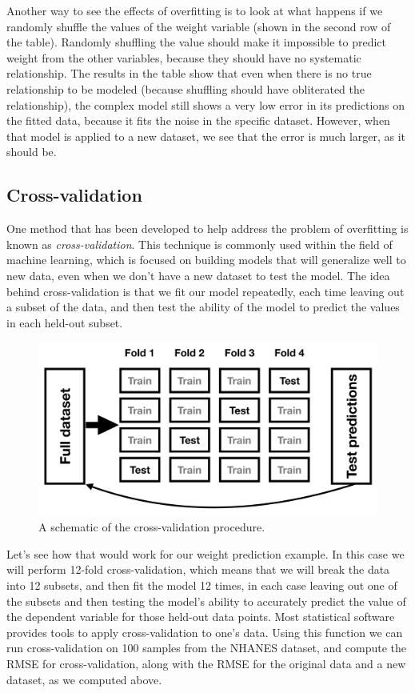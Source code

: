 \documentclass[
  12pt,
]{book}
\begin{document}
Another way to see the effects of overfitting is to look at what happens if we randomly shuffle the values of the weight variable (shown in the second row of the table). Randomly shuffling the value should make it impossible to predict weight from the other variables, because they should have no systematic relationship. The results in the table show that even when there is no true relationship to be modeled (because shuffling should have obliterated the relationship), the complex model still shows a very low error in its predictions on the fitted data, because it fits the noise in the specific dataset. However, when that model is applied to a new dataset, we see that the error is much larger, as it should be.

\hypertarget{cross-validation}{%
\subsection{Cross-validation}\label{cross-validation}}

One method that has been developed to help address the problem of overfitting is known as \emph{cross-validation}. This technique is commonly used within the field of machine learning, which is focused on building models that will generalize well to new data, even when we don't have a new dataset to test the model. The idea behind cross-validation is that we fit our model repeatedly, each time leaving out a subset of the data, and then test the ability of the model to predict the values in each held-out subset.

\begin{figure}
\includegraphics[width=45.74in,height=0.3\textheight]{images/crossvalidation} \caption{A schematic of the  cross-validation procedure.}\label{fig:crossvalidation}
\end{figure}

Let's see how that would work for our weight prediction example. In this case we will perform 12-fold cross-validation, which means that we will break the data into 12 subsets, and then fit the model 12 times, in each case leaving out one of the subsets and then testing the model's ability to accurately predict the value of the dependent variable for those held-out data points. Most statistical software provides tools to apply cross-validation to one's data. Using this function we can run cross-validation on 100 samples from the NHANES dataset, and compute the RMSE for cross-validation, along with the RMSE for the original data and a new dataset, as we computed above.
\end{document}
